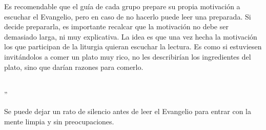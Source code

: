 Es recomendable que el guía de cada grupo prepare su propia motivación a escuchar el Evangelio, pero en caso de no hacerlo puede leer una preparada. Si decide prepararla, es importante recalcar que la motivación no debe ser demasiado larga, ni muy explicativa. La idea es que una vez hecha la motivación los que participan de la liturgia quieran escuchar la lectura. Es como si estuviesen invitándolos a comer un plato muy rico, no les describirían los ingredientes del plato, sino que darían razones para comerlo.

\hfill \\ \hfill
''
\hfill \\ \hfill

Se puede dejar un rato de silencio antes de leer el Evangelio para entrar con la mente limpia y sin preocupaciones.

\newpage
